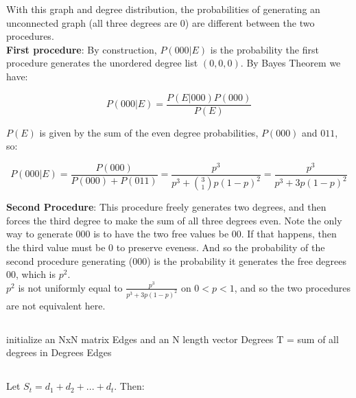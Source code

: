 \documentclass{article}
\begin{document}
With this graph and degree distribution, the probabilities of generating an unconnected graph (all three degrees are 0) are different between the two procedures. \\

\textbf{First procedure}: By construction, $P(000| E)$ is the probability the first procedure generates the unordered degree list $(0,0,0)$. By Bayes Theorem we have:

$$P(000|E) = \frac{P(E|000)P(000)}{P(E)}$$

$P(E)$ is given by the sum of the even degree probabilities, $P(000)$ and $011$, so:

$$P(000|E) = \frac{P(000)}{P(000) + P(011)} = \frac{p^3}{p^3 + \binom{3}{1}p(1-p)^2} = \frac{p^3}{p^3 + 3p(1-p)^2}$$

\textbf{Second Procedure}: This procedure freely generates two degrees, and then forces the third degree to make the sum of all three degrees even. Note the only way to generate 000 is to have the two free values be 00. If that happens, then the third value must be 0 to preserve eveness. And so the probability of the second procedure generating (000) is the probability it generates the free degrees 00, which is $p^2$. \\

$p^2$ is not uniformly equal to $\frac{p^3}{p^3 + 3p(1-p)^2}$ on $0 < p < 1$, and so the two procedures are not equivalent here.


\subsection{} 

\begin{algorithm}[H]
 initialize an NxN matrix Edges and an N length vector Degrees\;
T = sum of all degrees in Degrees\;
\Return Edges

\end{algorithm}

\subsection{}
Let $S_t = d_1 + d_2 + ... + d_t$. Then:
\end{document}

